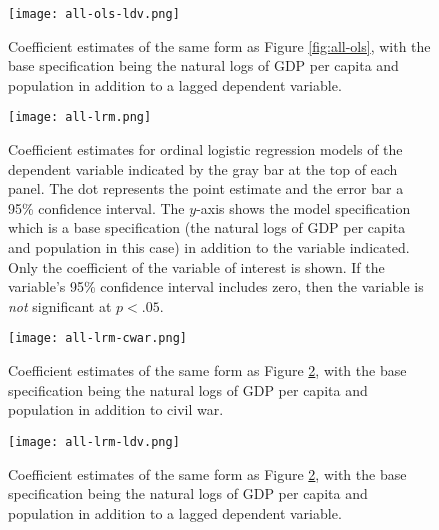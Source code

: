 \documentclass[12pt]{article}
\begin{document}
\begin{figure}[!htpb]
\texttt{[image: all-ols-ldv.png]}
\caption{Coefficient estimates of the same form as Figure \ref{fig:all-ols}, with the base specification being the natural logs of GDP per capita and population in addition to a lagged dependent variable.}
\label{fig:all-ols-ldv}
\end{figure}

\begin{figure}[!htpb]
\texttt{[image: all-lrm.png]}
\caption{Coefficient estimates for ordinal logistic regression models of the dependent variable indicated by the gray bar at the top of each panel. The dot represents the point estimate and the error bar a 95\% confidence interval. The $y$-axis shows the model specification which is a base specification (the natural logs of GDP per capita and population in this case) in addition to the variable indicated. Only the coefficient of the variable of interest is shown. If the variable's 95\% confidence interval includes zero, then the variable is \textit{not} significant at $p < .05$.}
\label{fig:all-lrm}
\end{figure}

\begin{figure}[!htpb]
\texttt{[image: all-lrm-cwar.png]}
\caption{Coefficient estimates of the same form as Figure \ref{fig:all-lrm}, with the base specification being the natural logs of GDP per capita and population in addition to civil war.}
\label{fig:all-lrm-cwar}
\end{figure}

\begin{figure}[!htpb]
\texttt{[image: all-lrm-ldv.png]}
\caption{Coefficient estimates of the same form as Figure \ref{fig:all-lrm}, with the base specification being the natural logs of GDP per capita and population in addition to a lagged dependent variable.}
\label{fig:all-lrm-ldv}
\end{figure}
\end{document}
